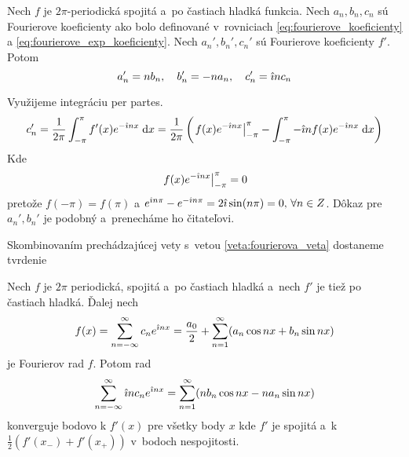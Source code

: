 \begin{veta}
    Nech $f$ je $2\pi$-periodická spojitá a~po častiach hladká funkcia.
    Nech $a_n,b_n,c_n$ sú Fourierove koeficienty ako bolo definované
    v~rovniciach \eqref{eq:fourierove_koeficienty} a
        \eqref{eq:fourierove_exp_koeficienty}.
    Nech $a_n',b_n',c_n'$ sú Fourierove koeficienty $f'$. Potom 
    \begin{equation}
        a_n' = n b_n, \quad b_n' = -n a_n, \quad c_n' = \hat{\imath} n c_n
        \label{eq:derivacia_koeficienty}
    \end{equation}
    \label{veta:derivacia_koeficienty}
\end{veta}
\begin{dokaz}
    Využijeme integráciu per partes.
    \begin{equation*}
      c_n' = \frac{1}{2\pi} \int_{-\pi}^{\pi} f'(x) e^{-\hat{\imath} n x} \; \mathrm{d} x =
        \frac{1}{2\pi} \left(
          \left. f(x) e^{-\hat{\imath} n x}\right|_{-\pi}^{\pi} -
          \int_{-\pi}^{\pi} -\hat{\imath} n f(x) e^{-\hat{\imath} n x} \; \mathrm{d} x
          \right)
    \end{equation*}
    Kde
    \begin{equation*}
          \left. f(x) e^{-\hat{\imath} n x}\right|_{-\pi}^{\pi} = 0
    \end{equation*}
    pretože $f(-\pi)=f(\pi)$ a $e^{\hat{\imath} n \pi} - e^{-\hat{\imath} n \pi} =
    2\hat{\imath} \sin(n \pi) = 0, \,
    \forall n\in Z$.
    Dôkaz pre $a_n',b_n'$ je podobný a~prenecháme ho čitateľovi.
\end{dokaz}

Skombinovaním prechádzajúcej vety s~vetou \ref{veta:fourierova_veta}
dostaneme tvrdenie
\begin{veta}
    Nech $f$ je $2\pi$ periodická, spojitá a~po častiach hladká a~nech
    $f'$ je tiež po častiach hladká. Ďalej nech    
    \begin{equation*}
        f(x) = \sum_{n=-\infty}^{\infty} c_n e^{\hat{\imath} n x} = 
         \frac{a_0}{2} + \sum_{n=1}^{\infty} (
            a_n \cos n x + b_n \sin n x)        
    \end{equation*}
    je Fourierov rad $f$. Potom rad
    \begin{equation*}
        \sum_{n=-\infty}^{\infty} \hat{\imath} n c_n e^{\hat{\imath} n x} = 
         \sum_{n=1}^{\infty} (
            n b_n \cos n x - n a_n \sin n x)        
    \end{equation*}
    konverguje bodovo k $f'(x)$ pre všetky body $x$ kde $f'$ je
    spojitá a~k $\frac{1}{2}(f'(x_-) + f'(x_+) )$ v~bodoch
    nespojitosti.
    \label{veta:fourier_derivacia}
\end{veta}

